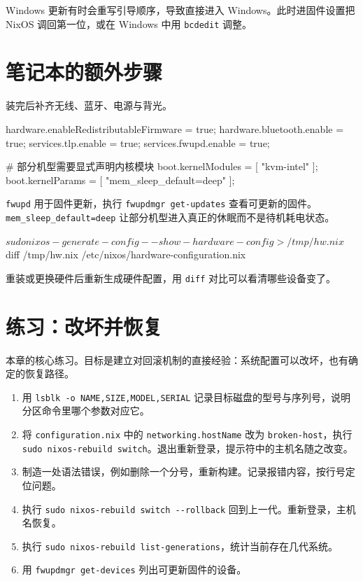 Windows 更新有时会重写引导顺序，导致直接进入 Windows。此时进固件设置把 NixOS 调回第一位，或在 Windows 中用 \texttt{bcdedit} 调整。

\section{笔记本的额外步骤}

装完后补齐无线、蓝牙、电源与背光。

\begin{nixcode}
hardware.enableRedistributableFirmware = true;
hardware.bluetooth.enable = true;
services.tlp.enable = true;
services.fwupd.enable = true;

# 部分机型需要显式声明内核模块
boot.kernelModules = [ "kvm-intel" ];
boot.kernelParams = [ "mem_sleep_default=deep" ];
\end{nixcode}

\texttt{fwupd} 用于固件更新，执行 \texttt{fwupdmgr get-updates} 查看可更新的固件。\texttt{mem\_sleep\_\allowbreak{}default=deep} 让部分机型进入真正的休眠而不是待机耗电状态。

\begin{shellsession}
$ sudo nixos-generate-config --show-hardware-config > /tmp/hw.nix
$ diff /tmp/hw.nix /etc/nixos/hardware-configuration.nix
\end{shellsession}

重装或更换硬件后重新生成硬件配置，用 \texttt{diff} 对比可以看清哪些设备变了。

\section{练习：改坏并恢复}

本章的核心练习。目标是建立对回滚机制的直接经验：系统配置可以改坏，也有确定的恢复路径。

\begin{enumerate}
  \item 用 \texttt{lsblk -o NAME,SIZE,MODEL,SERIAL} 记录目标磁盘的型号与序列号，说明分区命令里哪个参数对应它。
  \item 将 \texttt{configuration.\allowbreak{}nix} 中的 \texttt{networking.\allowbreak{}hostName} 改为 \texttt{broken-host}，执行 \texttt{sudo nixos-\allowbreak{}rebuild switch}。退出重新登录，提示符中的主机名随之改变。
  \item 制造一处语法错误，例如删除一个分号，重新构建。记录报错内容，按行号定位问题。
  \item 执行 \texttt{sudo nixos-rebuild switch -{}-rollback} 回到上一代。重新登录，主机名恢复。
  \item 执行 \texttt{sudo nixos-\allowbreak{}rebuild list-\allowbreak{}generations}，统计当前存在几代系统。
  \item 用 \texttt{fwupdmgr get-devices} 列出可更新固件的设备。
\end{enumerate}

